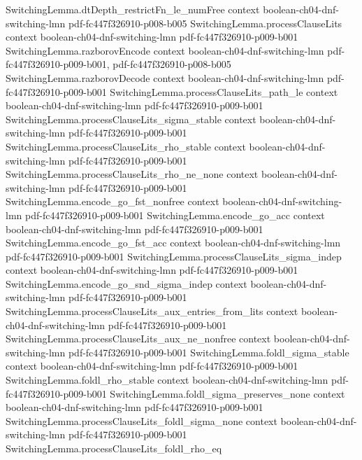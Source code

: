 \begin{lemma}
\proofstep
  {SwitchingLemma.dtDepth_restrictFn_le_numFree}
  {context}
  {boolean-ch04-dnf-switching-lmn}
  {pdf-fc447f326910-p008-b005}
\proofstep
  {SwitchingLemma.processClauseLits}
  {context}
  {boolean-ch04-dnf-switching-lmn}
  {pdf-fc447f326910-p009-b001}
\proofstep
  {SwitchingLemma.razborovEncode}
  {context}
  {boolean-ch04-dnf-switching-lmn}
  {pdf-fc447f326910-p009-b001,
    pdf-fc447f326910-p008-b005}
\proofstep
  {SwitchingLemma.razborovDecode}
  {context}
  {boolean-ch04-dnf-switching-lmn}
  {pdf-fc447f326910-p009-b001}
\proofstep
  {SwitchingLemma.processClauseLits_path_le}
  {context}
  {boolean-ch04-dnf-switching-lmn}
  {pdf-fc447f326910-p009-b001}
\proofstep
  {SwitchingLemma.processClauseLits_sigma_stable}
  {context}
  {boolean-ch04-dnf-switching-lmn}
  {pdf-fc447f326910-p009-b001}
\proofstep
  {SwitchingLemma.processClauseLits_rho_stable}
  {context}
  {boolean-ch04-dnf-switching-lmn}
  {pdf-fc447f326910-p009-b001}
\proofstep
  {SwitchingLemma.processClauseLits_rho_ne_none}
  {context}
  {boolean-ch04-dnf-switching-lmn}
  {pdf-fc447f326910-p009-b001}
\proofstep
  {SwitchingLemma.encode_go_fst_nonfree}
  {context}
  {boolean-ch04-dnf-switching-lmn}
  {pdf-fc447f326910-p009-b001}
\proofstep
  {SwitchingLemma.encode_go_acc}
  {context}
  {boolean-ch04-dnf-switching-lmn}
  {pdf-fc447f326910-p009-b001}
\proofstep
  {SwitchingLemma.encode_go_fst_acc}
  {context}
  {boolean-ch04-dnf-switching-lmn}
  {pdf-fc447f326910-p009-b001}
\proofstep
  {SwitchingLemma.processClauseLits_sigma_indep}
  {context}
  {boolean-ch04-dnf-switching-lmn}
  {pdf-fc447f326910-p009-b001}
\proofstep
  {SwitchingLemma.encode_go_snd_sigma_indep}
  {context}
  {boolean-ch04-dnf-switching-lmn}
  {pdf-fc447f326910-p009-b001}
\proofstep
  {SwitchingLemma.processClauseLits_aux_entries_from_lits}
  {context}
  {boolean-ch04-dnf-switching-lmn}
  {pdf-fc447f326910-p009-b001}
\proofstep
  {SwitchingLemma.processClauseLits_aux_ne_nonfree}
  {context}
  {boolean-ch04-dnf-switching-lmn}
  {pdf-fc447f326910-p009-b001}
\proofstep
  {SwitchingLemma.foldl_sigma_stable}
  {context}
  {boolean-ch04-dnf-switching-lmn}
  {pdf-fc447f326910-p009-b001}
\proofstep
  {SwitchingLemma.foldl_rho_stable}
  {context}
  {boolean-ch04-dnf-switching-lmn}
  {pdf-fc447f326910-p009-b001}
\proofstep
  {SwitchingLemma.foldl_sigma_preserves_none}
  {context}
  {boolean-ch04-dnf-switching-lmn}
  {pdf-fc447f326910-p009-b001}
\proofstep
  {SwitchingLemma.processClauseLits_foldl_sigma_none}
  {context}
  {boolean-ch04-dnf-switching-lmn}
  {pdf-fc447f326910-p009-b001}
\proofstep
  {SwitchingLemma.processClauseLits_foldl_rho_eq}

\end{lemma}
